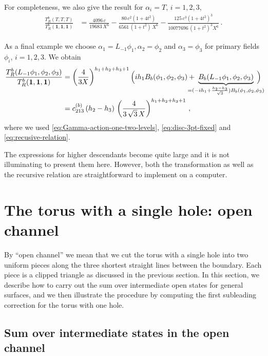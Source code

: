 \documentclass[11pt,a4paper]{article}
\numberwithin{equation}{section}
\newcommand{\one}{\mathbf{1}} %
\begin{document}
\noindent 
For completeness, we also give the result for $\alpha_i = T$, $i=1,2,3$, 
\begin{align}
    \frac{T_R^b(T,T,T)}{T_R^b(\one,\one,\one)} &= 
    \frac{4096\,c}{19683\, X^6} - \frac{80\,c^2(1+4t^2)}{6561 \,(1+t^2)\, X^6} - \frac{125\,c^3 (1+4t^2)^3}{10077696\, (1+t^2)^3 X^6}\,.
\end{align}

\noindent
As a final example we choose $\alpha_1=L_{-1}\phi_1, \alpha_2 =  \phi_2$ and $\alpha_3 = \phi_3$ for primary fields $\phi_i$, $i=1,2,3$. We obtain
\begin{align}
    \frac{T_R^b(L_{-1}\phi_1,\phi_2,\phi_3)}{T_R^b(\one,\one,\one)} &= 
    \left(\frac{4}{3X}\right)^{h_1+h_2+h_3 +1} 
    \Big(i h_1 B_b(\phi_1,\phi_2,\phi_3) + 
    \hspace{-1.2em}
    \underbrace{B_b(L_{-1}\phi_1,\phi_2,\phi_3)}_{= (-ih_1 + \frac{h_2 -h_3}{\sqrt{3}})B_b(\phi_1,\phi_2,\phi_3)}
    \hspace{-1.2em} 
    \Big)\nonumber\\
    &= c^{(b)}_{213} \, (h_2-h_3)\,
\left(\frac{4}{3\,\sqrt{3}\,X}\right)^{h_1+h_2+h_3 +1}\,,
\end{align}
%
where we used \eqref{eq:Gamma-action-one-two-levels}, \eqref{eq:disc-3pt-fixed} and \eqref{eq:recusive-relation}. 

The expressions for higher descendants become quite large and it is not illuminating to present them here. However, both the transformation as well as the recursive relation are straightforward to implement on a computer. 

\section{The torus with a single hole: open channel}\label{sec:open-channel-approx}

By ``open channel'' we mean that we cut the torus with a single hole into two uniform pieces along the three shortest straight lines between the boundary. Each piece is a clipped triangle as discussed in the previous section. 
In this section, we describe how to carry out the sum over intermediate open states for general surfaces, and we then illustrate the procedure by computing the first subleading correction for the torus with one hole.

\subsection{Sum over intermediate states in the open channel}\label{sec:intermediate_state_sum}
\end{document}
